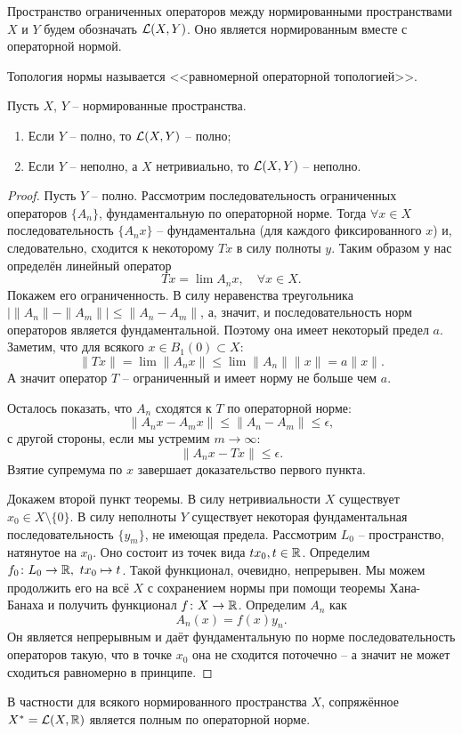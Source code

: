 \begin{definition}
    Пространство ограниченных операторов между нормированными пространствами $X$ и $Y$ будем обозначать $\mathcal{L}(X, Y)$.
    Оно является нормированным вместе с операторной нормой.

    Топология нормы называется <<равномерной операторной топологией>>.
\end{definition}
\begin{proposition}
    Пусть $X$, $Y$ -- нормированные пространства.
    \begin{enumerate}
        \item Если $Y$ -- полно, то $\mathcal{L}(X, Y)$ -- полно;
        \item Если $Y$ -- неполно, а $X$ нетривиально, то $\mathcal{L}(X, Y)$ -- неполно.
    \end{enumerate}
\end{proposition}
\begin{proof}
    Пусть $Y$ -- полно.
    Рассмотрим последовательность ограниченных операторов $\{A_n\}$, фундаментальную по операторной норме.
    Тогда $\forall x \in X$ последовательность $\{A_n x\}$ -- фундаментальна (для каждого фиксированного $x$) и, следовательно, сходится к некоторому $Tx$ в силу полноты $y$.
    Таким образом у нас определён линейный оператор
    \[
        Tx = \lim A_n x, \quad \forall x \in X.
    \]
    Покажем его ограниченность.
    В силу неравенства треугольника $|\|A_n\| - \|A_m\|| \leq \|A_n - A_m\|$, а, значит, и последовательность норм операторов является фундаментальной.
    Поэтому она имеет некоторый предел $a$.
    Заметим, что для всякого $x \in B_1(0) \subset X\colon$
    \[
        \|Tx\| = \lim \|A_n x\| \leq \lim\|A_n\|\|x\| = a\|x\|.
    \]
    А значит оператор $T$ -- ограниченный и имеет норму не больше чем $a$.

    Осталось показать, что $A_n$ сходятся к $T$ по операторной норме:
    \[
        \|A_n x - A_m x\| \leq \|A_n - A_m\| \leq \epsilon,
    \]
    с другой стороны, если мы устремим $m \rightarrow \infty\colon$
    \[
        \|A_n x - Tx\| \leq \epsilon.
    \]
    Взятие супремума по $x$ завершает доказательство первого пункта.

    Докажем второй пункт теоремы.
    В силу нетривиальности $X$ существует $x_0 \in X \setminus \{0\}$.
    В силу неполноты $Y$ существует некоторая фундаментальная последовательность $\{y_m\}$, не имеющая предела.
    Рассмотрим $L_0$ -- пространство, натянутое на $x_0$.
    Оно состоит из точек вида $t x_0, t \in \mathbb{R}$.
    Определим $f_0\colon L_0 \to \R, \ tx_0 \mapsto t$.
    Такой функционал, очевидно, непрерывен.
    Мы можем продолжить его на всё $X$ с сохранением нормы при помощи теоремы Хана-Банаха и получить функционал $f\colon X \to \mathbb{R}$.
    Определим $A_n$ как
    \[
        A_n(x) = f(x)y_n.
    \]
    Он является непрерывным и даёт фундаментальную по норме последовательность операторов такую, что в точке $x_0$ она не сходится поточечно -- а значит не может сходиться равномерно в принципе.
\end{proof}
\begin{note}
    В частности для всякого нормированного пространства $X$, сопряжённое $X^* = \mathcal{L}(X, \mathbb{R})$ является полным по операторной норме.
\end{note}